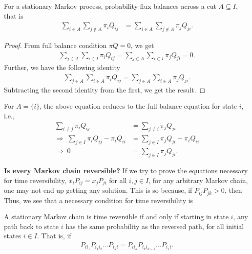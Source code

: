 \documentclass[a4paper,10pt,english]{article}
\begin{document}
\begin{lem} 
\label{lem:fluxbalance}
For a stationary Markov process, probability flux balances across a cut $A \subseteq I$, that is
\begin{align*}
\sum_{i \in A}\sum_{j \notin A} \pi_iQ_{ij} &= \sum_{i \in A}\sum_{j \notin A} \pi_jQ_{ji}.
\end{align*}
\end{lem}
\begin{proof} From full balance condition $\pi Q = 0$, we get
\begin{align*}
\sum_{j \in A}\sum_{i \in I}\pi_iQ_{ij} = \sum_{j \in A}\sum_{i \in I}\pi_j Q_{ji} = 0.
\end{align*}
Further, we have the following identity
\begin{align*}
\sum_{j \in A}\sum_{i \in A}\pi_iQ_{ij} = \sum_{j \in A}\sum_{i \in A}\pi_j Q_{ji}.
\end{align*}
Subtracting the second identity from the first, we get the result.
\end{proof}
\begin{cor} 
For $A= \{i\}$, the above equation reduces to the full balance equation for state $i$, i.e.,
\begin{align*}
\sum_{i \neq j}\pi_iQ_{ij} &= \sum_{j \neq i}\pi_j Q_{ji} \\
\Rightarrow \; \sum_{j \in I}\pi_i Q_{ij} - \pi_iQ_{ii} &= \sum_{j \in I}\pi_j Q_{ji} - \pi_i Q_{ii} \\
\Rightarrow \; 0 &=  \sum_{j \in I}\pi_j Q_{ji}.
\end{align*}
\end{cor}

{\bf Is every Markov chain reversible?} If we try to prove the equations necessary for time reversibility, $x_iP_{ij}=x_jP_{ji}$ for all $i,j \in I$, for any arbitrary Markov chain, one may not end up getting any solution. 
This is so because, if $P_{ij}P_{jk}>0$, then 
Thus, we see that a necessary condition for time reversibility is 
\begin{thm}
A stationary Markov chain is time reversible if and only if starting in state $i$, 
any path back to state $i$ has the same probability as the reversed path, for all initial states $i \in I$. 
That is, if
\begin{align*}
P_{i i_1}P_{i_1 i_2}\hdots P_{i_k i}=P_{ii_k}P_{i_k i_{k-1}} \hdots P_{i_1i}.
\end{align*} 
\end{thm}
\end{document}
